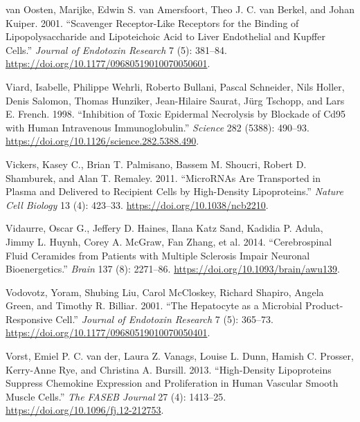 \documentclass[9pt,lineno]{elife}
\newlength{\cslhangindent}
\newlength{\cslentryspacingunit} %
\newenvironment{CSLReferences}[2] %
 {%
  \setlength{\parindent}{0pt}
  \ifodd #1
  \let\oldpar\par
  \def\par{\hangindent=\cslhangindent\oldpar}
  \fi
  \setlength{\parskip}{#2\cslentryspacingunit}
 }%
 {}
\begin{document}
\begin{CSLReferences}{1}{0}
\leavevmode{}%
van Oosten, Marijke, Edwin S. van Amersfoort, Theo J. C. van Berkel, and Johan Kuiper. 2001. {``Scavenger Receptor-Like Receptors for the Binding of Lipopolysaccharide and Lipoteichoic Acid to Liver Endothelial and {Kupffer} Cells.''} \emph{Journal of Endotoxin Research} 7 (5): 381--84. \url{https://doi.org/10.1177/09680519010070050601}.

\leavevmode{}%
Viard, Isabelle, Philippe Wehrli, Roberto Bullani, Pascal Schneider, Nils Holler, Denis Salomon, Thomas Hunziker, Jean-Hilaire Saurat, Jürg Tschopp, and Lars E. French. 1998. {``Inhibition of {Toxic Epidermal Necrolysis} by {Blockade} of {Cd95} with {Human Intravenous Immunoglobulin}.''} \emph{Science} 282 (5388): 490--93. \url{https://doi.org/10.1126/science.282.5388.490}.

\leavevmode{}%
Vickers, Kasey C., Brian T. Palmisano, Bassem M. Shoucri, Robert D. Shamburek, and Alan T. Remaley. 2011. {``{MicroRNAs} Are Transported in Plasma and Delivered to Recipient Cells by High-Density Lipoproteins.''} \emph{Nature Cell Biology} 13 (4): 423--33. \url{https://doi.org/10.1038/ncb2210}.

\leavevmode{}%
Vidaurre, Oscar G., Jeffery D. Haines, Ilana Katz Sand, Kadidia P. Adula, Jimmy L. Huynh, Corey A. McGraw, Fan Zhang, et al. 2014. {``Cerebrospinal Fluid Ceramides from Patients with Multiple Sclerosis Impair Neuronal Bioenergetics.''} \emph{Brain} 137 (8): 2271--86. \url{https://doi.org/10.1093/brain/awu139}.

\leavevmode{}%
Vodovotz, Yoram, Shubing Liu, Carol McCloskey, Richard Shapiro, Angela Green, and Timothy R. Billiar. 2001. {``The Hepatocyte as a Microbial Product-Responsive Cell.''} \emph{Journal of Endotoxin Research} 7 (5): 365--73. \url{https://doi.org/10.1177/09680519010070050401}.

\leavevmode{}%
Vorst, Emiel P. C. van der, Laura Z. Vanags, Louise L. Dunn, Hamish C. Prosser, Kerry-Anne Rye, and Christina A. Bursill. 2013. {``High-Density Lipoproteins Suppress Chemokine Expression and Proliferation in Human Vascular Smooth Muscle Cells.''} \emph{The FASEB Journal} 27 (4): 1413--25. \url{https://doi.org/10.1096/fj.12-212753}.


\end{CSLReferences}
\end{document}
